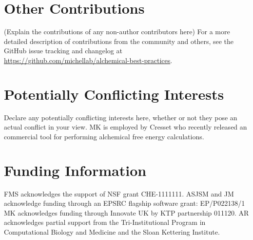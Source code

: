 \documentclass[9pt,bestpractices]{livecoms}
\newcommand{\githubrepository}{\url{https://github.com/michellab/alchemical-best-practices}}  %
\begin{document}
\section*{Other Contributions}
%

(Explain the contributions of any non-author contributors here)
For a more detailed description of contributions from the community and others, see the GitHub issue tracking and changelog at \githubrepository.



\section*{Potentially Conflicting Interests}

Declare any potentially conflicting interests here, whether or not they pose an actual conflict in your view.
MK is employed by Cresset who recently released an commercial tool for performing alchemical free energy calculations.

\section*{Funding Information}
FMS acknowledges the support of NSF grant CHE-1111111.
ASJSM and JM acknowledge funding through an EPSRC flagship software grant: EP/P022138/1
MK acknowledges funding through Innovate UK by KTP partnership 011120.
AR acknowledges partial support from the Tri-Institutional Program in Computational Biology and Medicine and the Sloan Kettering Institute.




\end{document}

